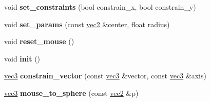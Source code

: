 \begin{DoxyCompactItemize}
\item 
\hypertarget{class_arcball_a9217b887f7995b0c2c4bb4aaca2724e7}{void {\bfseries set\+\_\+constraints} (bool constrain\+\_\+x, bool constrain\+\_\+y)}\label{class_arcball_a9217b887f7995b0c2c4bb4aaca2724e7}

\item 
\hypertarget{class_arcball_ab92493e1a6d46098ac94858bed94cfb9}{void {\bfseries set\+\_\+params} (const \hyperlink{classvec2}{vec2} \&center, float radius)}\label{class_arcball_ab92493e1a6d46098ac94858bed94cfb9}

\item 
\hypertarget{class_arcball_a84c136cde1e8ee0c8ad9265e197399fb}{void {\bfseries reset\+\_\+mouse} ()}\label{class_arcball_a84c136cde1e8ee0c8ad9265e197399fb}

\item 
\hypertarget{class_arcball_ab3ff4548e3c265c9971929d185ca1fde}{void {\bfseries init} ()}\label{class_arcball_ab3ff4548e3c265c9971929d185ca1fde}

\item 
\hypertarget{class_arcball_a7d1844da5342c4b851eb4d99a7279754}{\hyperlink{classvec3}{vec3} {\bfseries constrain\+\_\+vector} (const \hyperlink{classvec3}{vec3} \&vector, const \hyperlink{classvec3}{vec3} \&axis)}\label{class_arcball_a7d1844da5342c4b851eb4d99a7279754}

\item 
\hypertarget{class_arcball_a500607cd1adbc27193462e2f3d2a2e7c}{\hyperlink{classvec3}{vec3} {\bfseries mouse\+\_\+to\+\_\+sphere} (const \hyperlink{classvec2}{vec2} \&p)}\label{class_arcball_a500607cd1adbc27193462e2f3d2a2e7c}

\end{DoxyCompactItemize}
